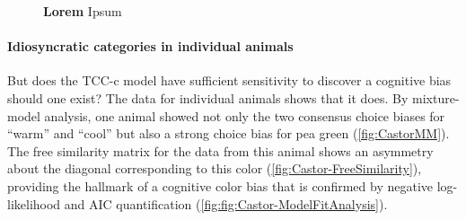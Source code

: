 \begin{figure}
    \centering
    \begin{subfigure}[b]{0.2\textwidth}
         \centering
         \caption{}
         
         \label{fig:CastorMM}
    \end{subfigure}
    \hfill
    \begin{subfigure}[b]{0.38\textwidth}
         \centering
         \caption{}
         
         \label{fig:Castor-FreeSimilarity}
    \end{subfigure}
    \hfill
       \begin{subfigure}[b]{0.38\textwidth}
         \centering
         \caption{}
                  \label{fig:fig:Castor-ModelFitAnalysis}
    \end{subfigure}
    \caption{\textbf{Lorem}
    Ipsum}
    \label{fig:IndiDataCogBias}
\end{figure}

\paragraph{Idiosyncratic categories in individual animals}
But does the TCC-c model have sufficient sensitivity to discover a cognitive bias should one exist? 
The data for individual animals shows that it does. 
By mixture-model analysis, one animal showed not only the two consensus choice biases for “warm” and “cool” but also a strong choice bias for pea green (\autoref{fig:CastorMM}). 
The free similarity matrix for the data from this animal shows an asymmetry about the diagonal corresponding to this color (\autoref{fig:Castor-FreeSimilarity}), providing the hallmark of a cognitive color bias that is confirmed by negative log-likelihood and AIC quantification (\autoref{fig:fig:Castor-ModelFitAnalysis}).


